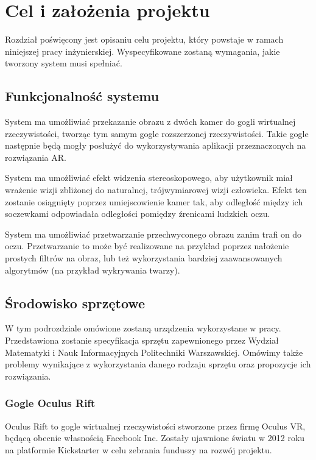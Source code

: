 \documentclass[a4paper,11pt,twoside]{report}
\theoremstyle{definition}
\begin{document}
\chapter{Cel i założenia projektu} %

Rozdział poświęcony jest opisaniu celu projektu, który powstaje w ramach niniejszej pracy inżynierskiej. Wyspecyfikowane zostaną wymagania, jakie tworzony system musi spełniać.

\section{Funkcjonalność systemu}

System ma umożliwiać przekazanie obrazu z dwóch kamer do gogli wirtualnej rzeczywistości, tworząc tym samym gogle rozszerzonej rzeczywistości. Takie gogle następnie będą mogły posłużyć do wykorzystywania aplikacji przeznaczonych na rozwiązania AR. 

System ma umożliwiać efekt widzenia stereoskopowego, aby użytkownik miał wrażenie wizji zbliżonej do naturalnej, trójwymiarowej wizji człowieka. Efekt ten zostanie osiągnięty poprzez umiejscowienie kamer tak, aby odległość między ich soczewkami odpowiadała odległości pomiędzy źrenicami ludzkich oczu. 

System ma umożliwiać przetwarzanie przechwyconego obrazu zanim trafi on do oczu. Przetwarzanie to może być realizowane na przykład poprzez nałożenie prostych filtrów na obraz, lub też wykorzystania bardziej zaawansowanych algorytmów (na przykład wykrywania twarzy).

\section{Środowisko sprzętowe}

W tym podrozdziale omówione zostaną urządzenia wykorzystane w pracy. Przedstawiona zostanie specyfikacja sprzętu zapewnionego przez Wydział Matematyki i Nauk Informacyjnych Politechniki Warszawskiej. Omówimy także problemy wynikające z wykorzystania danego rodzaju sprzętu oraz propozycje ich rozwiązania.

\subsection{Gogle Oculus Rift}

Oculus Rift to gogle wirtualnej rzeczywistości stworzone przez firmę Oculus VR, będącą obecnie własnością Facebook Inc. Zostały ujawnione światu w 2012 roku na platformie Kickstarter w celu zebrania funduszy na rozwój projektu. 
\end{document}
